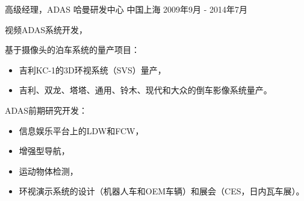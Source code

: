 \documentclass[../cv_cn.tex]{subfiles}
\begin{document}
\begin{cventries}
  \cventry
    {高级经理，ADAS} %
    {哈曼研发中心} %
    {中国上海} %
    {2009年9月 - 2014年7月} %
    {
      \begin{cvitems}
        \item 视频ADAS系统开发，
        \item 基于摄像头的泊车系统的量产项目：
          \begin{itemize}
            \item 吉利KC-1的3D环视系统（SVS）量产，
            \item 吉利、双龙、塔塔、通用、铃木、现代和大众的倒车影像系统量产。
           \end{itemize}
        \item ADAS前期研究开发：
          \begin{itemize}
            \item 信息娱乐平台上的LDW和FCW，
            \item 增强型导航，
            \item 运动物体检测，
            \item 环视演示系统的设计（机器人车和OEM车辆）和展会（CES，日内瓦车展）。
          \end{itemize}
      \end{cvitems}
    }
\end{cventries}
\end{document}
